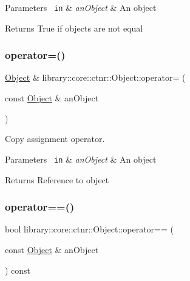 \begin{DoxyParams}[1]{Parameters}
\mbox{\texttt{ in}}  & {\em an\+Object} & An object \\
\hline
\end{DoxyParams}
\begin{DoxyReturn}{Returns}
True if objects are not equal 
\end{DoxyReturn}
\mbox{\label{classlibrary_1_1core_1_1ctnr_1_1_object_a48f26f6297266090793fc53862654122}} 
\subsubsection{\texorpdfstring{operator=()}{operator=()}}
{\footnotesize\ttfamily \mbox{\hyperlink{classlibrary_1_1core_1_1ctnr_1_1_object}{Object}} \& library\+::core\+::ctnr\+::\+Object\+::operator= (\begin{DoxyParamCaption}\item[{const \mbox{\hyperlink{classlibrary_1_1core_1_1ctnr_1_1_object}{Object}} \&}]{an\+Object }\end{DoxyParamCaption})}



Copy assignment operator. 


\begin{DoxyParams}[1]{Parameters}
\mbox{\texttt{ in}}  & {\em an\+Object} & An object \\
\hline
\end{DoxyParams}
\begin{DoxyReturn}{Returns}
Reference to object 
\end{DoxyReturn}
\mbox{\label{classlibrary_1_1core_1_1ctnr_1_1_object_a543801cb9c7c22432603aca5435595e9}} 
\subsubsection{\texorpdfstring{operator==()}{operator==()}}
{\footnotesize\ttfamily bool library\+::core\+::ctnr\+::\+Object\+::operator== (\begin{DoxyParamCaption}\item[{const \mbox{\hyperlink{classlibrary_1_1core_1_1ctnr_1_1_object}{Object}} \&}]{an\+Object }\end{DoxyParamCaption}) const}



